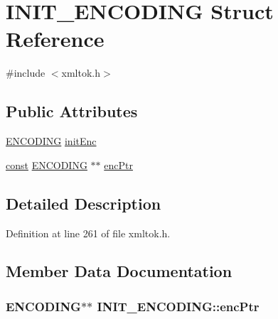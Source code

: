 \hypertarget{struct_i_n_i_t___e_n_c_o_d_i_n_g}{}\section{I\+N\+I\+T\+\_\+\+E\+N\+C\+O\+D\+I\+NG Struct Reference}
\label{struct_i_n_i_t___e_n_c_o_d_i_n_g}


{\ttfamily \#include $<$xmltok.\+h$>$}

\subsection*{Public Attributes}
\begin{DoxyCompactItemize}
\item 
\hyperlink{xmltok_8h_a46834e73898ebab478b38f817a8c6fc0}{E\+N\+C\+O\+D\+I\+NG} \hyperlink{struct_i_n_i_t___e_n_c_o_d_i_n_g_af315cfdb5c933b05fdc0523f4d591221}{init\+Enc}
\item 
\hyperlink{getopt1_8c_a2c212835823e3c54a8ab6d95c652660e}{const} \hyperlink{xmltok_8h_a46834e73898ebab478b38f817a8c6fc0}{E\+N\+C\+O\+D\+I\+NG} $\ast$$\ast$ \hyperlink{struct_i_n_i_t___e_n_c_o_d_i_n_g_a88e7b26311a762f388a855e3fbc794f3}{enc\+Ptr}
\end{DoxyCompactItemize}


\subsection{Detailed Description}


Definition at line 261 of file xmltok.\+h.



\subsection{Member Data Documentation}
\subsubsection[{\texorpdfstring{enc\+Ptr}{encPtr}}]{ {\bf E\+N\+C\+O\+D\+I\+NG}$\ast$$\ast$ I\+N\+I\+T\+\_\+\+E\+N\+C\+O\+D\+I\+N\+G\+::enc\+Ptr}\hypertarget{struct_i_n_i_t___e_n_c_o_d_i_n_g_a88e7b26311a762f388a855e3fbc794f3}{}\label{struct_i_n_i_t___e_n_c_o_d_i_n_g_a88e7b26311a762f388a855e3fbc794f3}


